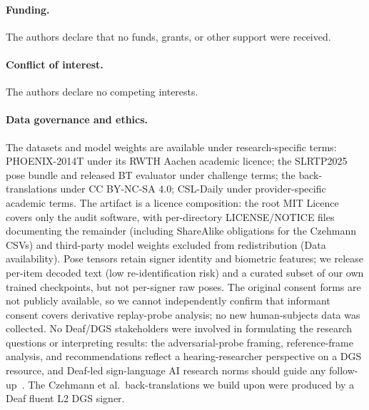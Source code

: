 \documentclass[pdflatex,sn-chicago]{sn-jnl}
\begin{document}
\paragraph{Funding.} The authors declare that no funds, grants, or other support were received.
\paragraph{Conflict of interest.} The authors declare no competing interests.
\paragraph{Data governance and ethics.} The datasets and model weights are available under research-specific terms: PHOENIX-2014T under its RWTH Aachen academic licence; the SLRTP2025 pose bundle and released BT evaluator under challenge terms; the \citet{czehmann2026sacred} back-translations under CC BY-NC-SA 4.0; CSL-Daily under provider-specific academic terms. The artifact is a licence composition: the root MIT Licence covers only the audit software, with per-directory LICENSE/NOTICE files documenting the remainder (including ShareAlike obligations for the Czehmann CSVs) and third-party model weights excluded from redistribution (Data availability). Pose tensors retain signer identity and biometric features; we release per-item decoded text (low re-identification risk) and a curated subset of our own trained checkpoints, but not per-signer raw poses. The original consent forms are not publicly available, so we cannot independently confirm that informant consent covers derivative replay-probe analysis; no new human-subjects data was collected. No Deaf/DGS stakeholders were involved in formulating the research questions or interpreting results: the adversarial-probe framing, reference-frame analysis, and recommendations reflect a hearing-researcher perspective on a DGS resource, and Deaf-led sign-language AI research norms should guide any follow-up~\cite{desai2024systemic}. The Czehmann et al.\ back-translations we build upon were produced by a Deaf fluent L2 DGS signer.
\end{document}
